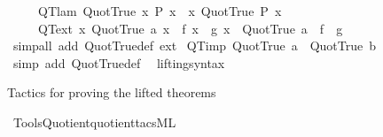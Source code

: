 \begin{isabellebody}
\ \ \ \ \ QT{\isacharunderscore}{\kern0pt}lam{\isacharcolon}{\kern0pt}\ {\isachardoublequoteopen}Quot{\isacharunderscore}{\kern0pt}True\ {\isacharparenleft}{\kern0pt}{\isasymlambda}x{\isachardot}{\kern0pt}\ P\ x{\isacharparenright}{\kern0pt}\ {\isasymLongrightarrow}\ {\isacharparenleft}{\kern0pt}{\isasymAnd}x{\isachardot}{\kern0pt}\ Quot{\isacharunderscore}{\kern0pt}True\ {\isacharparenleft}{\kern0pt}P\ x{\isacharparenright}{\kern0pt}{\isacharparenright}{\kern0pt}{\isachardoublequoteclose}\isanewline
\ \ \ \ \ QT{\isacharunderscore}{\kern0pt}ext{\isacharcolon}{\kern0pt}\ {\isachardoublequoteopen}{\isacharparenleft}{\kern0pt}{\isasymAnd}x{\isachardot}{\kern0pt}\ Quot{\isacharunderscore}{\kern0pt}True\ {\isacharparenleft}{\kern0pt}a\ x{\isacharparenright}{\kern0pt}\ {\isasymLongrightarrow}\ f\ x\ {\isacharequal}{\kern0pt}\ g\ x{\isacharparenright}{\kern0pt}\ {\isasymLongrightarrow}\ {\isacharparenleft}{\kern0pt}Quot{\isacharunderscore}{\kern0pt}True\ a\ {\isasymLongrightarrow}\ f\ {\isacharequal}{\kern0pt}\ g{\isacharparenright}{\kern0pt}{\isachardoublequoteclose}\isanewline
%
\isadelimproof
\ \ %
\endisadelimproof
%
\isatagproof
{}\isamarkupfalse%
\ {\isacharparenleft}{\kern0pt}simp{\isacharunderscore}{\kern0pt}all\ add{\isacharcolon}{\kern0pt}\ Quot{\isacharunderscore}{\kern0pt}True{\isacharunderscore}{\kern0pt}def\ ext{\isacharparenright}{\kern0pt}%
\endisatagproof
{\isafoldproof}%
%
\isadelimproof
\isanewline
%
\endisadelimproof
\isanewline
{}\isamarkupfalse%
\ QT{\isacharunderscore}{\kern0pt}imp{\isacharcolon}{\kern0pt}\ {\isachardoublequoteopen}Quot{\isacharunderscore}{\kern0pt}True\ a\ {\isasymequiv}\ Quot{\isacharunderscore}{\kern0pt}True\ b{\isachardoublequoteclose}\isanewline
%
\isadelimproof
\ \ %
\endisadelimproof
%
\isatagproof
{}\isamarkupfalse%
\ {\isacharparenleft}{\kern0pt}simp\ add{\isacharcolon}{\kern0pt}\ Quot{\isacharunderscore}{\kern0pt}True{\isacharunderscore}{\kern0pt}def{\isacharparenright}{\kern0pt}%
\endisatagproof
{\isafoldproof}%
%
\isadelimproof
\isanewline
%
\endisadelimproof
\isanewline
{}\isamarkupfalse%
\ \ lifting{\isacharunderscore}{\kern0pt}syntax\isanewline
{}%
\begin{isamarkuptext}%
Tactics for proving the lifted theorems%
\end{isamarkuptext}\isamarkuptrue%
%
\isadelimML
%
\endisadelimML
%
\isatagML
{}\isamarkupfalse%
\ {\isacartoucheopen}Tools{\isacharslash}{\kern0pt}Quotient{\isacharslash}{\kern0pt}quotient{\isacharunderscore}{\kern0pt}tacs{\isachardot}{\kern0pt}ML{\isacartoucheclose}%

\end{isabellebody}

